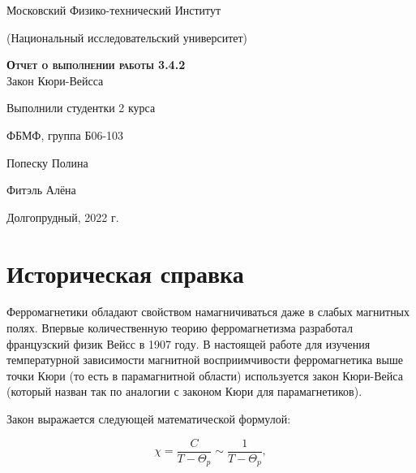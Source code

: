 \documentclass[12pt,a4paper]{article}
\begin{document}
\begin{titlepage}
  \begin{center}
    \huge
    Московский Физико-технический Институт
    
    (Национальный исследовательский университет)
    \vspace{0.5cm}

   
    \vspace{0.25cm}
 
    \vfill
 
    \vfill

    \textsc{\bf{Отчет о выполнении работы 3.4.2}}\\[3mm]
    
    {\LARGE Закон Кюри-Вейсса}
  \bigskip
    \vfill
    
\end{center}
\vfill
\begin{flushright}

    Выполнили студентки 2 курса
    
    ФБМФ, группа Б06-103

    Попеску Полина
    
    
    Фитэль Алёна

\end{flushright}
\bigskip


\vfill

\begin{center}
  Долгопрудный, 2022 г.
\end{center}
\end{titlepage}


\section{Историческая справка}

Ферромагнетики обладают свойством намагничиваться даже в слабых магнитных полях. Впервые количественную теорию ферромагнетизма разработал французский физик Вейсс в 1907 году. В настоящей работе для изучения температурной зависимости магнитной восприимчивости ферромагнетика выше точки Кюри (то есть в парамагнитной области) используется закон Кюри-Вейса (который назван так по аналогии с законом Кюри для парамагнетиков).

Закон выражается следующей математической формулой:

 \begin{equation}\label{QW}
 \chi ={\frac  {C}{T-\Theta_p}} \sim \frac{1}{T - \Theta_p}, 
 \end{equation}
 
\end{document}
